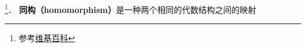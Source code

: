 

\footnote{参考\href{https://en.wikipedia.org/wiki/Homomorphism}{维基百科}}． \textbf{同构（homomorphism）}是一种两个相同的代数结构之间的映射

